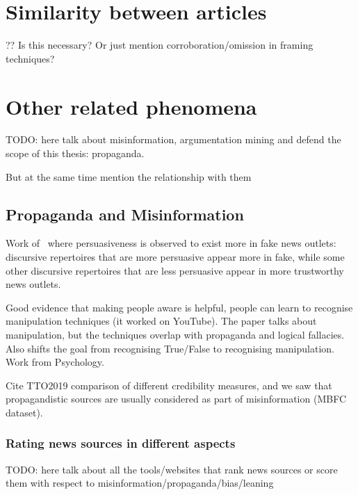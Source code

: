 


\section{Similarity between articles}
\label{sec:lit_relationships}

?? Is this necessary? Or just mention corroboration/omission in framing techniques?

\section{Other related phenomena}

TODO: here talk about misinformation, argumentation mining and defend the scope of this thesis: propaganda.

But at the same time mention the relationship with them

\subsection{Propaganda and Misinformation}

Work of~\citet{orrumachine} where persuasiveness is observed to exist more in fake news outlets: discursive repertoires that are more persuasive appear more in fake, while some other discursive repertoires that are less persuasive appear in more trustworthy news outlets.




\cite{roozenbeek2022countering} Good evidence that making people aware is helpful, people can learn to recognise manipulation techniques (it worked on YouTube). The paper talks about manipulation, but the techniques overlap with propaganda and logical fallacies. Also shifts the goal from recognising True/False to recognising manipulation. Work from Psychology.

Cite TTO2019 comparison of different credibility measures, and we saw that propagandistic sources are usually considered as part of misinformation (MBFC dataset).

\subsubsection{Rating news sources in different aspects}

TODO: here talk about all the tools/websites that rank news sources or score them with respect to misinformation/propaganda/bias/leaning


